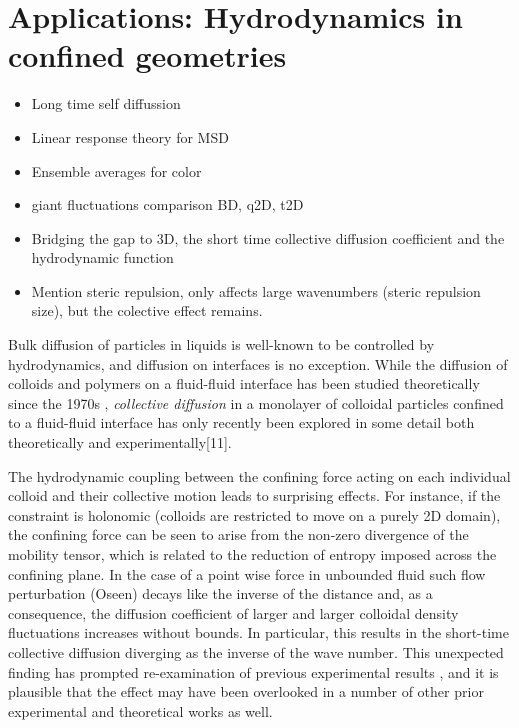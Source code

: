 \documentclass[ twoside,openright,titlepage,numbers=noenddot,%
headinclude,footinclude,cleardoublepage=empty,abstract=on,
BCOR=5mm,paper=a4,fontsize=11pt, dvipsnames
]{scrreprt}
\begin{document}
\chapter{Applications: Hydrodynamics in confined geometries}
\begin{itemize}
\item Long time self diffussion
\item Linear response theory for MSD
\item Ensemble averages for color
\item giant fluctuations comparison BD, q2D, t2D
\item Bridging the gap to 3D, the short time collective diffusion coefficient and the hydrodynamic function
\item Mention steric repulsion, only affects large wavenumbers (steric repulsion size), but the colective effect remains.
\end{itemize}
Bulk diffusion of particles in liquids is well-known to be controlled by hydrodynamics, and diffusion on interfaces is no exception. While the diffusion of colloids and polymers on a fluid-fluid interface has been studied theoretically since the 1970s \cite{FluidFluidInterface_Polymers,Diffusion2D_TwoViscosities}, \emph{collective diffusion} in a monolayer of colloidal particles confined to a fluid-fluid interface has only recently been explored in some detail both theoretically \cite{Bleibel2014,Bleibel2016,Bleibel2015} and experimentally[11].

The hydrodynamic coupling between the confining force acting on each individual colloid and their collective motion leads to surprising effects.
For instance, if the constraint is holonomic (colloids are restricted to move on a purely 2D domain), the confining force can be seen to arise from the non-zero divergence of the mobility tensor, which is related to the reduction of entropy imposed across the confining plane. In the case of a point wise force in unbounded fluid such flow perturbation (Oseen) decays like the inverse of the distance and, as a consequence, the diffusion coefficient of larger and larger colloidal density fluctuations increases without bounds. In particular, this results in the short-time collective diffusion diverging as the inverse of the wave number.
This unexpected finding has prompted re-examination of previous experimental results \cite{Diffusion2D_Experiments_Weitz,SD_TwoWalls,Diffusion2D_Experiments_Rice}, and it is plausible that the effect may have been overlooked in a number of other prior experimental and theoretical works as well.
\end{document}

